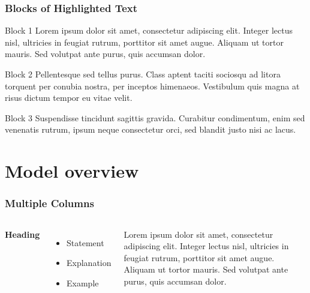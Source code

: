 \documentclass[xcolor=dvipsnames]{beamer}
\begin{document}
\begin{frame}
\frametitle{Blocks of Highlighted Text}
\begin{block}{Block 1}
Lorem ipsum dolor sit amet, consectetur adipiscing elit. Integer lectus nisl, ultricies in feugiat rutrum, porttitor sit amet augue. Aliquam ut tortor mauris. Sed volutpat ante purus, quis accumsan dolor.
\end{block}

\begin{block}{Block 2}
Pellentesque sed tellus purus. Class aptent taciti sociosqu ad litora torquent per conubia nostra, per inceptos himenaeos. Vestibulum quis magna at risus 
dictum tempor eu vitae velit.
\end{block}

\begin{block}{Block 3}
Suspendisse tincidunt sagittis gravida. Curabitur condimentum, enim sed venenatis rutrum, ipsum neque consectetur orci, sed blandit justo nisi ac lacus.
\end{block}
\end{frame}

\section{Model overview}

\begin{frame}
\tableofcontents[sectionstyle=show,square,currentsection]
\end{frame}

\begin{frame}
\frametitle{Multiple Columns}
\begin{columns}[c] %

\textbf{Heading}
\begin{itemize}
\item Statement
\item Explanation
\item Example
\end{itemize}

Lorem ipsum dolor sit amet, consectetur adipiscing elit. Integer lectus nisl, ultricies in feugiat rutrum, porttitor sit amet augue. Aliquam ut tortor mauris. Sed volutpat ante purus, quis accumsan dolor.

\end{columns}
\end{frame}
\end{document}
